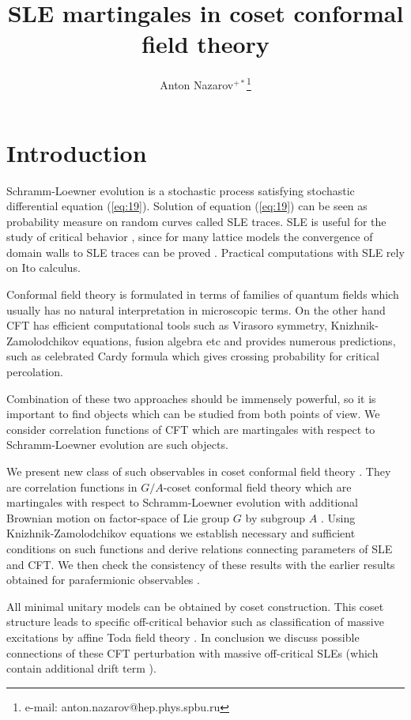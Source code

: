 \documentclass{jetpl}
\title{SLE martingales in coset conformal field theory}
\author{Anton Nazarov$^{+*}$\/\thanks{e-mail: anton.nazarov@hep.phys.spbu.ru}}
\begin{document}
\maketitle

\section{Introduction}
\label{sec:introduction}

Schramm-Loewner evolution \cite{schramm2000scaling} is a stochastic process satisfying stochastic differential equation (\ref{eq:19}). Solution of equation (\ref{eq:19}) can be seen as probability measure on random curves called SLE traces. SLE is  useful for the study of critical behavior \cite{Cardy:2005kh,rohde2005basic}, since for many lattice models  the convergence of  domain walls to SLE traces can be proved \cite{bauer20062d,schramm2006conformally}. Practical computations with SLE rely on Ito calculus. 

Conformal field theory \cite{belavin1984ics} is formulated in terms of families of quantum fields which usually has no natural interpretation in microscopic terms. On the other hand CFT has efficient computational tools such as Virasoro symmetry, Knizhnik-Zamolodchikov equations, fusion algebra etc and provides numerous predictions, such as celebrated Cardy formula \cite{cardy1992critical,smirnov2001critical} which gives crossing probability for critical percolation. 

Combination of these two approaches should be immensely powerful, so it is important to find objects which can be studied from both points of view. We consider correlation functions of CFT which are martingales with respect to Schramm-Loewner evolution are such objects.

We present new class of such observables in coset conformal field theory \cite{Goddard198588}. They are correlation functions in $G/A$-coset conformal field theory which are martingales with respect to Schramm-Loewner evolution with additional Brownian motion on factor-space of Lie group $G$ by subgroup $A$ \cite{2011arXiv1112.4354N}. Using Knizhnik-Zamolodchikov equations we establish necessary and sufficient conditions on such functions and derive relations connecting parameters of SLE and CFT. We then check the consistency of these results with the earlier results obtained for parafermionic observables \cite{santachiara2008sle}. 

All minimal unitary models can be obtained by coset construction. This coset structure leads to specific off-critical behavior such as classification of massive excitations by affine Toda field theory \cite{fateev1990conformal,eguchi1989deformations,hollowood1989rational}. In conclusion we discuss possible connections of these CFT perturbation with massive off-critical SLEs (which contain additional drift term  \cite{makarov2010off}).
\end{document}
